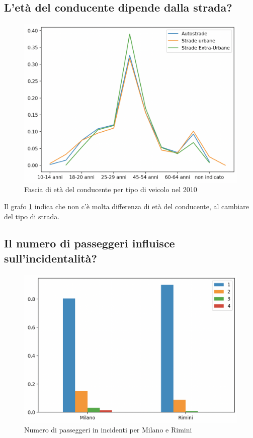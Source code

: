 \documentclass[a4paper]{report}
\begin{document}
\subsection{L'età del conducente dipende dalla strada?}

\begin{figure}
    \includegraphics[width=\linewidth]{../src/incidenti/incidenti_senza_coords/tipo_veicoli/differenza_eta.png}
    \caption{Fascia di età del conducente per tipo di veicolo nel 2010}
    \label{fig:differenza-eta}
\end{figure}

Il grafo \ref{fig:differenza-eta} indica che non c'è molta differenza di età del conducente, 
al cambiare del tipo di strada.



\subsection{Il numero di passeggeri influisce sull'incidentalità?}

\begin{figure}
    \includegraphics[width=\linewidth]{../src/incidenti/incidenti_senza_coords/tipo_veicoli/passeggeri.png}
    \caption{Numero di passeggeri in incidenti per Milano e Rimini}
    \label{fig:passeggeri-milano-rimini}
\end{figure}
\end{document}
